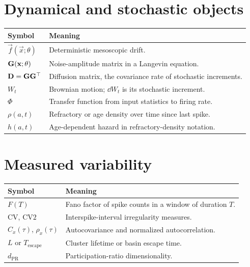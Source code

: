 \section*{Dynamical and stochastic objects}

\begin{tabularx}{\textwidth}{@{}p{}X@{}}
  \toprule
  \textbf{Symbol} & \textbf{Meaning} \\
  \midrule
  $\vec f(\vec x;\theta)$ & Deterministic mesoscopic drift. \\
  $\mathbf{G}(\mathbf{x};\theta)$ & Noise-amplitude matrix in a Langevin equation. \\
  $\mathbf{D}=\mathbf{G}\mathbf{G}^\top$ & Diffusion matrix, the covariance rate of stochastic increments. \\
  $W_t$ & Brownian motion; $\dd W_t$ is its stochastic increment. \\
  $\Phi$ & Transfer function from input statistics to firing rate. \\
  $\rho(a,t)$ & Refractory or age density over time since last spike. \\
  $h(a,t)$ & Age-dependent hazard in refractory-density notation. \\
  \bottomrule
\end{tabularx}

\section*{Measured variability}

\begin{tabularx}{\textwidth}{@{}p{}X@{}}
  \toprule
  \textbf{Symbol} & \textbf{Meaning} \\
  \midrule
  $F(T)$ & Fano factor of spike counts in a window of duration $T$. \\
  $\mathrm{CV}$, $\mathrm{CV2}$ & Interspike-interval irregularity measures. \\
  $C_x(\tau)$, $\rho_x(\tau)$ & Autocovariance and normalized autocorrelation. \\
  $L$ or $T_{\mathrm{escape}}$ & Cluster lifetime or basin escape time. \\
  $d_{\mathrm{PR}}$ & Participation-ratio dimensionality. \\
  \bottomrule
\end{tabularx}
